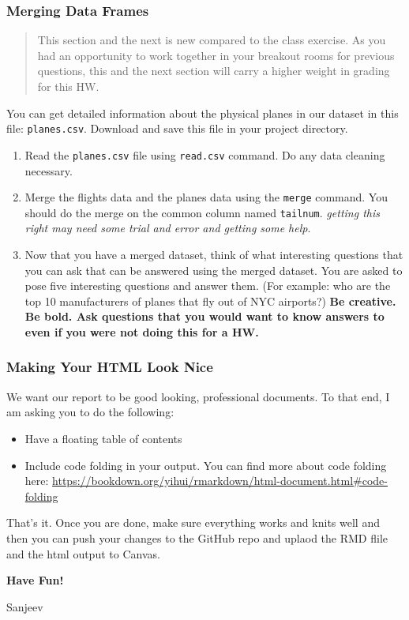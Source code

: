 \documentclass[
]{article}
\begin{document}
\hypertarget{merging-data-frames}{%
\subsubsection{Merging Data Frames}\label{merging-data-frames}}

\begin{quote}
This section and the next is new compared to the class exercise. As you
had an opportunity to work together in your breakout rooms for previous
questions, this and the next section will carry a higher weight in
grading for this HW.
\end{quote}

You can get detailed information about the physical planes in our
dataset in this file: \texttt{planes.csv}. Download and save this file
in your project directory.

\begin{enumerate}
\def\labelenumi{\alph{enumi})}
\item
  Read the \texttt{planes.csv} file using \texttt{read.csv} command. Do
  any data cleaning necessary.
\item
  Merge the flights data and the planes data using the \texttt{merge}
  command. You should do the merge on the common column named
  \texttt{tailnum}. \emph{getting this right may need some trial and
  error and getting some help}.
\item
  Now that you have a merged dataset, think of what interesting
  questions that you can ask that can be answered using the merged
  dataset. You are asked to pose five interesting questions and answer
  them. (For example: who are the top 10 manufacturers of planes that
  fly out of NYC airports?) \textbf{Be creative. Be bold. Ask questions
  that you would want to know answers to even if you were not doing this
  for a HW. }
\end{enumerate}

\hypertarget{making-your-html-look-nice}{%
\subsubsection{Making Your HTML Look
Nice}\label{making-your-html-look-nice}}

We want our report to be good looking, professional documents. To that
end, I am asking you to do the following:

\begin{itemize}
\item
  Have a floating table of contents
\item
  Include code folding in your output. You can find more about code
  folding here:
  \url{https://bookdown.org/yihui/rmarkdown/html-document.html\#code-folding}
\end{itemize}

That's it. Once you are done, make sure everything works and knits well
and then you can push your changes to the GitHub repo and uplaod the RMD
flile and the html output to Canvas.

\textbf{Have Fun!}

Sanjeev
\end{document}
